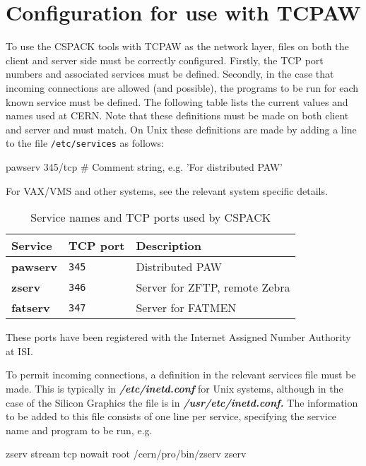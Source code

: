 \section{Configuration for use with TCPAW}
\par
To use the CSPACK tools with TCPAW as the network layer, files
on both the client and server side must be correctly configured.
Firstly, the TCP port numbers and associated services must be
defined. Secondly, in the case that incoming connections are
allowed (and possible), the programs to be run for each known
service must be defined. The following table lists the current
values and names used at CERN. Note that these definitions
must be made on both client and server and must match.
On Unix these definitions are made by adding a line to the
file {\tt/etc/services} as follows:
\begin{XMP}
pawserv  345/tcp   # Comment string, e.g. 'For distributed PAW'
\end{XMP}
For VAX/VMS and other systems, see the relevant system specific
details.
\begin{table}[h]
\caption{Service names and TCP ports used by CSPACK}
\begin{tabularx}{\textwidth}{|X|X|X|}
\hline
\bf Service   & \bf TCP port    &  \bf Description  \\
\hline
\bf pawserv   &{\tt 345}        &   Distributed PAW  \\
\bf zserv     &{\tt 346}        & Server for ZFTP, remote Zebra \\
\bf fatserv   &{\tt 347}        & Server for FATMEN  \\
\hline
\end{tabularx}
\end{table}
\par
These ports have been registered with the Internet Assigned Number Authority
at ISI.
\par
To permit incoming connections, a definition in the relevant
services file must be made. This is typically in {\bf\it /etc/inetd.conf}
 for Unix systems, although in the case of the Silicon Graphics the
file is in {\bf\it /usr/etc/inetd.conf.}
The information to be added to this file consists of one line
per service, specifying the service name and program to be run, e.g.
\begin{XMP}
zserv stream tcp nowait root /cern/pro/bin/zserv zserv
\end{XMP}
